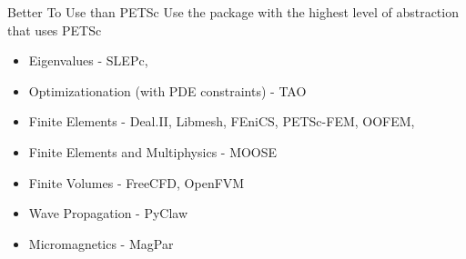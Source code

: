 

\begin{frame}{Better To Use than PETSc}
 Use the package with the highest level of abstraction that uses PETSc

    \begin{itemize}
    \item Eigenvalues - SLEPc,
    \item Optimizationation (with PDE constraints) - TAO
    \item Finite Elements -  Deal.II, Libmesh, FEniCS, PETSc-FEM,  OOFEM, 
    \item Finite Elements and Multiphysics - MOOSE 
    \item Finite Volumes -  FreeCFD, OpenFVM
    \item Wave Propagation - PyClaw
    \item Micromagnetics - MagPar
    \end{itemize}
\end{frame}
